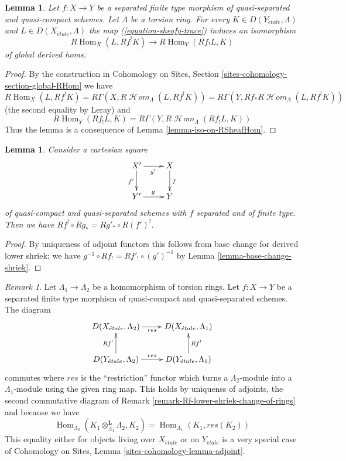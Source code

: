 \documentclass{stacks-project}
\theoremstyle{plain}
\newtheorem{lemma}[subsection]{Lemma}
\theoremstyle{definition}
\theoremstyle{remark}
\newtheorem{remark}[subsection]{Remark}
\numberwithin{equation}{subsection}
\def\Hom{\mathop{\mathrm{Hom}}\nolimits}
\def\SheafHom{\mathop{\mathcal{H}\!\mathit{om}}\nolimits}
\def\etale{{\acute{e}tale}}
\begin{document}
\begin{lemma}
\label{lemma-iso-global-hom}
Let $f : X \to Y$ be a separated finite type morphism of
quasi-separated and quasi-compact schemes. Let $\Lambda$ be a torsion ring.
For every $K \in D(Y_\etale, \Lambda)$ and $L \in D(X_\etale, \Lambda)$ the map
(\ref{equation-sheafy-trace}) induces an isomorphism
$$
R\Hom_X(L, Rf^!K) \longrightarrow R\Hom_Y(Rf_!L, K)
$$
of global derived homs.
\end{lemma}

\begin{proof}
By the construction in
Cohomology on Sites, Section \ref{sites-cohomology-section-global-RHom}
we have
$$
R\Hom_X(L, Rf^!K) =
R\Gamma(X, R\SheafHom_\Lambda(L, Rf^!K)) =
R\Gamma(Y, Rf_*R\SheafHom_\Lambda(L, Rf^!K))
$$
(the second equality by Leray) and
$$
R\Hom_Y(Rf_!L, K) = R\Gamma(Y, R\SheafHom_\Lambda(Rf_!L, K))
$$
Thus the lemma is a consequence of Lemma \ref{lemma-iso-on-RSheafHom}.
\end{proof}

\begin{lemma}
\label{lemma-cartesian-square-Rf-upper-shriek}
Consider a cartesian square
$$
\xymatrix{
X' \ar[r]_{g'} \ar[d]_{f'} & X \ar[d]^f \\
Y' \ar[r]^g & Y
}
$$
of quasi-compact and quasi-separated schemes with $f$ separated and
of finite type. Then we have $Rf^! \circ Rg_* = Rg'_* \circ R(f')^!$.
\end{lemma}

\begin{proof}
By uniqueness of adjoint functors this follows from base change
for derived lower shriek: we have
$g^{-1} \circ Rf_! = Rf'_! \circ (g')^{-1}$ by
Lemma \ref{lemma-base-change-shriek}.
\end{proof}

\begin{remark}
\label{remark-Rf-upper-shriek-change-of-rings}
Let $\Lambda_1 \to \Lambda_2$ be a homomorphism of torsion rings.
Let $f : X \to Y$ be a separated finite type morphism of quasi-compact
and quasi-separated schemes. The diagram
$$
\xymatrix{
D(X_\etale, \Lambda_2) \ar[r]_{res} &
D(X_\etale, \Lambda_1) \\
D(Y_\etale, \Lambda_2) \ar[r]^{res} \ar[u]^{Rf^!} &
D(Y_\etale, \Lambda_1) \ar[u]_{Rf^!}
}
$$
commutes where $res$ is the ``restriction'' functor which turns a
$\Lambda_2$-module into a $\Lambda_1$-module using the given ring map.
This holds by uniquenss of adjoints, the second commutative diagram
of Remark \ref{remark-Rf-lower-shriek-change-of-rings} and because we have
$$
\Hom_{\Lambda_2}(K_1 \otimes_{\Lambda_1}^\mathbf{L} \Lambda_2, K_2) =
\Hom_{\Lambda_1}(K_1, res(K_2))
$$
This equality either for objects living over $X_\etale$ or on
$Y_\etale$ is a very special case of
Cohomology on Sites, Lemma \ref{sites-cohomology-lemma-adjoint}.
\end{remark}
\end{document}
